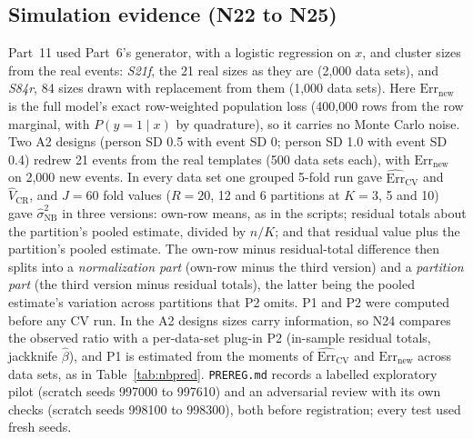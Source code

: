 \documentclass[11pt]{amsart}
\theoremstyle{plain}
\theoremstyle{definition}
\theoremstyle{remark}
\newcommand{\CV}{\widehat{\mathrm{Err}}_{\mathrm{CV}}}
\newcommand{\Errnew}{\mathrm{Err}_{\mathrm{new}}}
\newcommand{\VCR}{\hat V_{\mathrm{CR}}}
\newcommand{\VNB}{\hat\sigma^2_{\mathrm{NB}}}
\begin{document}
\subsection{Simulation evidence (N22 to N25)}
Part~11 used Part~6's generator, with a logistic regression on $x$, and cluster sizes from the real events: \emph{S21f}, the 21 real sizes as they are (2,000 data sets), and \emph{S84r}, 84 sizes drawn with replacement from them (1,000 data sets). Here $\Errnew$ is the full model's exact row-weighted population loss (400,000 rows from the row marginal, with $P(y=1\mid x)$ by quadrature), so it carries no Monte Carlo noise. Two A2 designs (person SD 0.5 with event SD 0; person SD 1.0 with event SD 0.4) redrew 21 events from the real templates (500 data sets each), with $\Errnew$ on 2,000 new events. In every data set one grouped 5-fold run gave $\CV$ and $\VCR$, and $J=60$ fold values ($R=20$, 12 and 6 partitions at $K=3$, 5 and 10) gave $\VNB$ in three versions: own-row means, as in the scripts; residual totals about the partition's pooled estimate, divided by $n/K$; and that residual value plus the partition's pooled estimate. The own-row minus residual-total difference then splits into a \emph{normalization part} (own-row minus the third version) and a \emph{partition part} (the third version minus residual totals), the latter being the pooled estimate's variation across partitions that P2 omits. P1 and P2 were computed before any CV run. In the A2 designs sizes carry information, so N24 compares the observed ratio with a per-data-set plug-in P2 (in-sample residual totals, jackknife $\hat\beta$), and P1 is estimated from the moments of $\CV$ and $\Errnew$ across data sets, as in Table~\ref{tab:nbpred}. \texttt{PREREG.md} records a labelled exploratory pilot (scratch seeds 997000 to 997610) and an adversarial review with its own checks (scratch seeds 998100 to 998300), both before registration; every test used fresh seeds.
\end{document}

